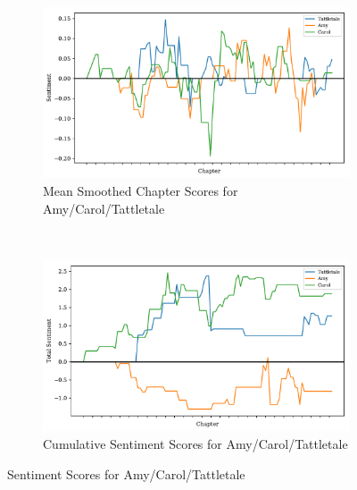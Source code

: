 \documentclass[11pt]{article}
\begin{document}
\begin{figure}[H]
\centering
\begin{subfigure}[t]{0.75\textwidth}
\centering
\includegraphics[width=\textwidth]{Aux Graphs v2/mean_smoothed_sent_scores.pdf}
\caption{Mean Smoothed Chapter Scores for Amy/Carol/Tattletale}
\label{aux_mean}
\end{subfigure}
~
\begin{subfigure}[t]{0.75\textwidth}
\centering
\includegraphics[width=\textwidth]{Aux Graphs v2/total_sent_scores.pdf}
\caption{Cumulative Sentiment Scores for Amy/Carol/Tattletale}
\label{aux_total}
\end{subfigure}
\caption{Sentiment Scores for Amy/Carol/Tattletale}
\label{aux_graphs}
\end{figure}
\end{document}
